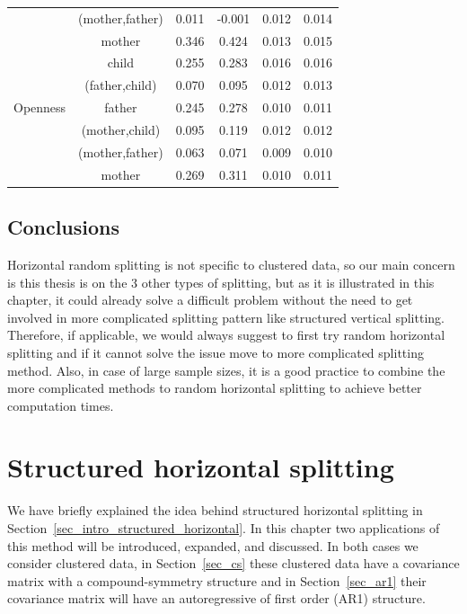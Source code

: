 \documentclass[11pt,a5paper,twoside]{book}
\begin{document}
\begin{table}[ht]
{\begin{tabular}{cccccc}
      &  (mother,father)  & 0.011 & -0.001 & 0.012 & 0.014 \\ 
      &  mother  & 0.346 & 0.424 & 0.013 & 0.015 \\ 
   \hline
  &  child  & 0.255 & 0.283 & 0.016 & 0.016 \\ 
      &  (father,child)  & 0.070 & 0.095 & 0.012 & 0.013 \\ 
    Openness  &  father  & 0.245 & 0.278 & 0.010 & 0.011 \\ 
      &  (mother,child)  & 0.095 & 0.119 & 0.012 & 0.012 \\ 
      &  (mother,father)  & 0.063 & 0.071 & 0.009 & 0.010 \\ 
      &  mother  & 0.269 & 0.311 & 0.010 & 0.011 \\ 
   \hline
\end{tabular}}

\end{table}

\section{Conclusions}

Horizontal random splitting is not specific to clustered data, so our main concern is this thesis is on the 3 other types of splitting, but as it is illustrated in this chapter, it could already solve a difficult problem without the need to get involved in more complicated splitting pattern like structured vertical splitting. Therefore, if applicable, we would always suggest to first try random horizontal splitting and if it cannot solve the issue move to more complicated splitting method. Also, in case of large sample sizes, it is a good practice to combine the more complicated methods to random horizontal splitting to achieve better computation times.



\chapter{Structured horizontal splitting}
\label{chap_struc_horiz}

We have briefly explained the idea behind structured horizontal splitting in Section~\ref{sec_intro_structured_horizontal}. In this chapter two applications of this method will be introduced, expanded, and discussed. In both cases we consider clustered data, in Section~\ref{sec_cs} these clustered data have a covariance matrix with a compound-symmetry structure and in Section~\ref{sec_ar1} their covariance matrix will have an autoregressive of first order (AR1) structure.
\end{document}
